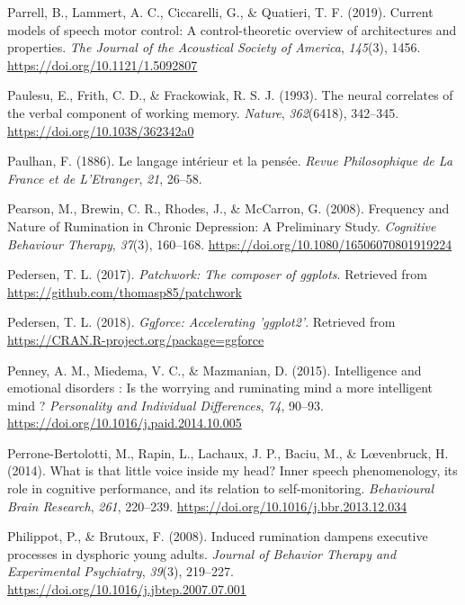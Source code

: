 \documentclass[a4paper,12pt,twoside,onecolumn,openright,final,oldfontcommands]{memoir}
\begin{document}
\leavevmode\hypertarget{ref-parrell_current_2019}{}%
Parrell, B., Lammert, A. C., Ciccarelli, G., \& Quatieri, T. F. (2019). Current models of speech motor control: A control-theoretic overview of architectures and properties. \emph{The Journal of the Acoustical Society of America}, \emph{145}(3), 1456. \url{https://doi.org/10.1121/1.5092807}

\leavevmode\hypertarget{ref-paulesu_neural_1993}{}%
Paulesu, E., Frith, C. D., \& Frackowiak, R. S. J. (1993). The neural correlates of the verbal component of working memory. \emph{Nature}, \emph{362}(6418), 342--345. \url{https://doi.org/10.1038/362342a0}

\leavevmode\hypertarget{ref-paulhan_langage_1886}{}%
Paulhan, F. (1886). Le langage intérieur et la pensée. \emph{Revue Philosophique de La France et de L'Etranger}, \emph{21}, 26--58.

\leavevmode\hypertarget{ref-pearson_frequency_2008}{}%
Pearson, M., Brewin, C. R., Rhodes, J., \& McCarron, G. (2008). Frequency and Nature of Rumination in Chronic Depression: A Preliminary Study. \emph{Cognitive Behaviour Therapy}, \emph{37}(3), 160--168. \url{https://doi.org/10.1080/16506070801919224}

\leavevmode\hypertarget{ref-R-patchwork}{}%
Pedersen, T. L. (2017). \emph{Patchwork: The composer of ggplots}. Retrieved from \url{https://github.com/thomasp85/patchwork}

\leavevmode\hypertarget{ref-R-ggforce}{}%
Pedersen, T. L. (2018). \emph{Ggforce: Accelerating 'ggplot2'}. Retrieved from \url{https://CRAN.R-project.org/package=ggforce}

\leavevmode\hypertarget{ref-Penney2015}{}%
Penney, A. M., Miedema, V. C., \& Mazmanian, D. (2015). Intelligence and emotional disorders : Is the worrying and ruminating mind a more intelligent mind ? \emph{Personality and Individual Differences}, \emph{74}, 90--93. \url{https://doi.org/10.1016/j.paid.2014.10.005}

\leavevmode\hypertarget{ref-Perrone-Bertolotti2014}{}%
Perrone-Bertolotti, M., Rapin, L., Lachaux, J. P., Baciu, M., \& Lœvenbruck, H. (2014). What is that little voice inside my head? Inner speech phenomenology, its role in cognitive performance, and its relation to self-monitoring. \emph{Behavioural Brain Research}, \emph{261}, 220--239. \url{https://doi.org/10.1016/j.bbr.2013.12.034}

\leavevmode\hypertarget{ref-Philippot2008}{}%
Philippot, P., \& Brutoux, F. (2008). Induced rumination dampens executive processes in dysphoric young adults. \emph{Journal of Behavior Therapy and Experimental Psychiatry}, \emph{39}(3), 219--227. \url{https://doi.org/10.1016/j.jbtep.2007.07.001}
\end{document}
